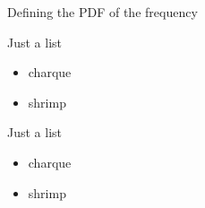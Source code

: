 ﻿\documentclass[mathserif]{beamer}
\begin{document}
	\begin{frame}{Defining the PDF of the frequency}
		\begin{graybox}{Just a list}
			\begin{itemize}
				\item charque
				\item shrimp
			\end{itemize}
		\end{graybox}
		\begin{grassgreenbox}{Just a list}
			\begin{itemize}
				\item charque
				\item shrimp
			\end{itemize}
		\end{grassgreenbox}
	\end{frame}
	
	

	
\end{document}
